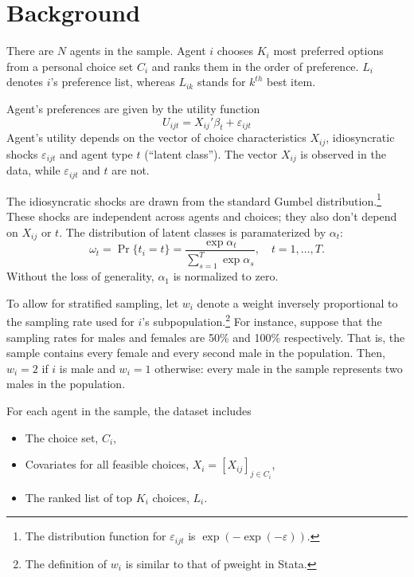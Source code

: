 \documentclass[12pt]{article}
\begin{document}
	

\section{Background}

There are $N$ agents in the sample. Agent $i$ chooses $K_i$ most preferred options from a personal choice set $C_i$ and ranks them in the order of preference. $L_i$ denotes $i$'s preference list, whereas $L_{ik}$ stands for $k^{th}$ best item.

Agent's preferences are given by the utility function
\begin{equation*}
	U_{ijt} = X_{ij}'\beta_t + \varepsilon_{ijt}
\end{equation*}
Agent's utility depends on the vector of choice characteristics $X_{ij}$, idiosyncratic shocks $\varepsilon_{ijt}$ and agent type $t$ (``latent class''). The vector $X_{ij}$ is observed in the data, while $\varepsilon_{ijt}$ and $t$ are not.

The idiosyncratic shocks are drawn from the standard Gumbel distribution.\footnote{The distribution function for $\varepsilon_{ijt}$ is $\exp(-\exp(-\varepsilon))$.} These shocks are independent across agents and choices; they also don't depend on $X_{ij}$ or $t$. The distribution of latent classes is paramaterized by $\alpha_t$:
\begin{equation*}
	\omega_t = \Pr\{t_i=t\} = \frac{\exp\alpha_t}{\sum_{s=1}^T\exp\alpha_s}, \quad t=1,\dots,T.
\end{equation*}
Without the loss of generality, $\alpha_1$ is normalized to zero.

To allow for stratified sampling, let $w_i$ denote a weight inversely proportional to the sampling rate used for $i$'s subpopulation.\footnote{The definition of $w_i$ is similar to that of pweight in Stata.} For instance, suppose that the sampling rates for males and females are 50\% and 100\% respectively. That is, the sample contains every female and every second male in the population. Then, $w_i = 2$ if $i$ is male and $w_i=1$ otherwise: every male in the sample represents two males in the population.

For each agent in the sample, the dataset includes
\begin{itemize}
	\item The choice set, $C_i$,
	\item Covariates for all feasible choices, $X_i = [X_{ij}]_{j\in C_i}$,
	\item The ranked list of top $K_i$ choices, $L_i$.
\end{itemize}
\end{document}
